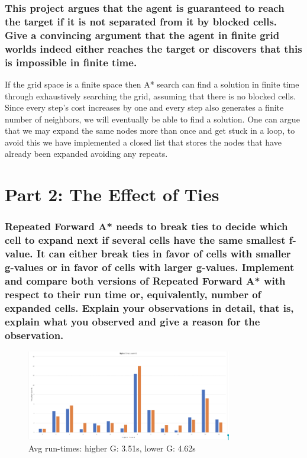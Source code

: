 \documentclass{article}
\begin{document}
\subsubsection*{This project argues that the agent is guaranteed to reach the target if it is not separated from it by blocked cells. Give a convincing argument that the agent in finite grid worlds indeed either reaches the target or discovers that this is impossible in finite time.}

If the grid space is a finite space then A* search can find a solution in finite time through exhaustively searching the grid, assuming that there is no blocked cells. Since every step's cost increases by one and every step also generates a finite number of neighbors, we will eventually be able to find a solution. One can argue that we may expand the same nodes more than once and get stuck in a loop, to avoid this we have implemented a closed list that stores the nodes that have already been expanded avoiding any repeats.


\section*{Part 2: The Effect of Ties}
\subsubsection*{Repeated Forward A* needs to break ties to decide which cell to expand next if
several cells have the same smallest f-value. It can either break ties in favor of cells with smaller g-values or in favor of
cells with larger g-values. Implement and compare both versions of Repeated Forward A* with respect to their run time or,
equivalently, number of expanded cells. Explain your observations in detail, that is, explain what you observed and give a
reason for the observation.}


\begin{figure}[h!]
  \centering
  \includegraphics[width=0.8\textwidth]{graph1.png}
  \caption{Avg run-times: higher G: 3.51s, lower G: 4.62s
}
\end{figure}
\end{document}
